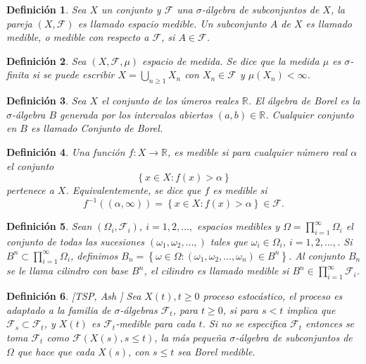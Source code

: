 \documentclass{article}
\newtheorem{Def}{Definición}
\newcommand{\rea}{\mathbb{R}}
\begin{document}
\begin{Def}
Sea $X$ un conjunto y $\mathcal{F}$ una $\sigma$-\'algebra de
subconjuntos de $X$, la pareja $\left(X,\mathcal{F}\right)$ es
llamado espacio medible. Un subconjunto $A$ de $X$ es llamado
medible, o medible con respecto a $\mathcal{F}$, si
$A\in\mathcal{F}$.
\end{Def}

\begin{Def}
Sea $\left(X,\mathcal{F},\mu\right)$ espacio de medida. Se dice
que la medida $\mu$ es $\sigma$-finita si se puede escribir
$X=\bigcup_{n\geq1}X_{n}$ con $X_{n}\in\mathcal{F}$ y
$\mu\left(X_{n}\right)<\infty$.
\end{Def}

\begin{Def}\label{Cto.Borel}
Sea $X$ el conjunto de los \'umeros reales $\rea$. El \'algebra de
Borel es la $\sigma$-\'algebra $B$ generada por los intervalos
abiertos $\left(a,b\right)\in\rea$. Cualquier conjunto en $B$ es
llamado {\em Conjunto de Borel}.
\end{Def}

\begin{Def}\label{Funcion.Medible}
Una funci\'on $f:X\rightarrow\rea$, es medible si para cualquier
n\'umero real $\alpha$ el conjunto
\[\left\{x\in X:f\left(x\right)>\alpha\right\}\]
pertenece a $X$. Equivalentemente, se dice que $f$ es medible si
\[f^{-1}\left(\left(\alpha,\infty\right)\right)=\left\{x\in X:f\left(x\right)>\alpha\right\}\in\mathcal{F}.\]
\end{Def}


\begin{Def}\label{Def.Cilindros}
Sean $\left(\Omega_{i},\mathcal{F}_{i}\right)$, $i=1,2,\ldots,$
espacios medibles y $\Omega=\prod_{i=1}^{\infty}\Omega_{i}$ el
conjunto de todas las sucesiones
$\left(\omega_{1},\omega_{2},\ldots,\right)$ tales que
$\omega_{i}\in\Omega_{i}$, $i=1,2,\ldots,$. Si
$B^{n}\subset\prod_{i=1}^{\infty}\Omega_{i}$, definimos
$B_{n}=\left\{\omega\in\Omega:\left(\omega_{1},\omega_{2},\ldots,\omega_{n}\right)\in
B^{n}\right\}$. Al conjunto $B_{n}$ se le llama {\em cilindro} con
base $B^{n}$, el cilindro es llamado medible si
$B^{n}\in\prod_{i=1}^{\infty}\mathcal{F}_{i}$.
\end{Def}


\begin{Def}\label{Def.Proc.Adaptado}[TSP, Ash \cite{RBA}]
Sea $X\left(t\right),t\geq0$ proceso estoc\'astico, el proceso es
adaptado a la familia de $\sigma$-\'algebras $\mathcal{F}_{t}$,
para $t\geq0$, si para $s<t$ implica que
$\mathcal{F}_{s}\subset\mathcal{F}_{t}$, y $X\left(t\right)$ es
$\mathcal{F}_{t}$-medible para cada $t$. Si no se especifica
$\mathcal{F}_{t}$ entonces se toma $\mathcal{F}_{t}$ como
$\mathcal{F}\left(X\left(s\right),s\leq t\right)$, la m\'as
peque\~na $\sigma$-\'algebra de subconjuntos de $\Omega$ que hace
que cada $X\left(s\right)$, con $s\leq t$ sea Borel medible.
\end{Def}
\end{document}
